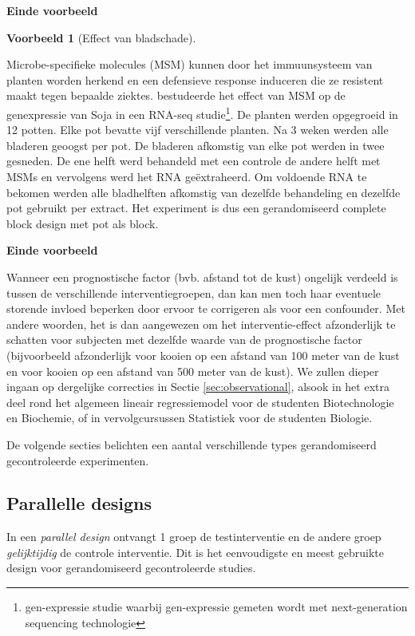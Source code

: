 \documentclass[
  12pt,dutch,coursenotes]{book}
\theoremstyle{definition}
\theoremstyle{definition}
\newtheorem{example}{Voorbeeld}[chapter]
\theoremstyle{definition}
\theoremstyle{remark}
\begin{document}
\textbf{Einde voorbeeld}

\begin{example}[Effect van bladschade]
\protect\hypertarget{exm:unnamed-chunk-74}{}{\label{exm:unnamed-chunk-74} \iffalse (Effect van bladschade) \fi{} }
\end{example}
Microbe-specifieke molecules (MSM) kunnen door het immuunsysteem van planten worden herkend en een defensieve response induceren die ze resistent maakt tegen bepaalde ziektes. \citet{Valdes2014} bestudeerde het effect van MSM op de genexpressie van Soja in een RNA-seq studie\footnote{gen-expressie studie waarbij gen-expressie gemeten wordt met next-generation sequencing technologie}. De planten werden opgegroeid in 12 potten. Elke pot bevatte vijf verschillende planten. Na 3 weken werden alle bladeren geoogst per pot. De bladeren afkomstig van elke pot werden in twee gesneden. De ene helft werd behandeld met een controle de andere helft met MSMs en vervolgens werd het RNA geëxtraheerd. Om voldoende RNA te bekomen werden alle bladhelften afkomstig van dezelfde behandeling en dezelfde pot gebruikt per extract. Het experiment is dus een gerandomiseerd complete block design met pot als block.

\textbf{Einde voorbeeld}

Wanneer een prognostische factor (bvb. afstand tot de kust) ongelijk verdeeld is
tussen de verschillende interventiegroepen, dan kan men toch haar eventuele
storende invloed beperken door ervoor te corrigeren als voor een confounder.
Met andere woorden, het is dan aangewezen om het interventie-effect
afzonderlijk te schatten voor subjecten met dezelfde waarde van de
prognostische factor (bijvoorbeeld afzonderlijk voor kooien op een afstand van 100 meter van de kust en voor kooien op een afstand van 500 meter van de kust). We zullen dieper ingaan op dergelijke correcties
in Sectie \ref{sec:observational}, alsook in het extra deel rond het algemeen lineair regressiemodel voor de studenten Biotechnologie en Biochemie, of in vervolgcursussen Statistiek voor de studenten Biologie.

De volgende secties belichten een aantal verschillende types gerandomiseerd
gecontroleerde experimenten.

\hypertarget{parallelle-designs}{%
\subsection{Parallelle designs}\label{parallelle-designs}}

In een \emph{parallel design} ontvangt 1 groep de testinterventie en de
andere groep \emph{gelijktijdig} de controle interventie. Dit is het
eenvoudigste en meest gebruikte design voor gerandomiseerd gecontroleerde
studies.
\end{document}

